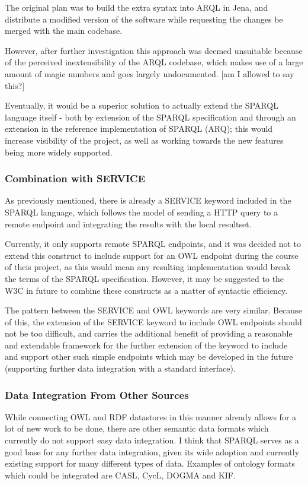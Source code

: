 \documentclass{article}
\begin{document}
The original plan was to build the extra syntax into ARQL in Jena, and
distribute a modified version of the software while requesting the changes be
merged with the main codebase.

However, after further investigation this approach was deemed unsuitable because
of the perceived inextensibility of the ARQL codebase, which makes use of a
large amount of magic numbers and goes largely undocumented. [am I allowed to
say this?]

Eventually, it would be a superior solution to actually extend the SPARQL
language itself - both by extension of the SPARQL
specification and through an extension in the reference implementation of SPARQL
(ARQ); this would increase visibility of the
project, as well as working towards the new features being more widely
supported.

\subsubsection{Combination with SERVICE}

As previously mentioned, there is already a SERVICE keyword included in the
SPARQL language, which follows the model of sending a HTTP query to a remote
endpoint and integrating the results with the local resultset.\cite{sservice}

Currently, it only supports remote SPARQL endpoints, and it was decided not to 
extend this construct to include support for an OWL endpoint during the course
of theis project, as this would mean any resulting implementation would break 
the terms of the SPARQL specification. However, it may be suggested to the W3C 
in future to combine these constructs as a matter of syntactic efficiency. 

The pattern between the SERVICE and OWL keywords are very
similar. Because of this, the extension of the SERVICE keyword to include OWL
endpoints should not be too difficult, and carries the additional benefit of
providing a reasonable and extendable framework for the further extension of the
keyword to include and support other such simple endpoints which may be
developed in the future (supporting further data integration with a standard
interface).

\subsubsection{Data Integration From Other Sources}

While connecting OWL and RDF datastores in this manner already allows for a lot
of new work to be done, there are other semantic data formats which currently do 
not support easy data integration. I think that SPARQL serves as a good base for 
any further data integration, given its wide adoption and currently existing 
support for many different types of data. Examples of ontology formats which
could be integrated are CASL, CycL, DOGMA and KIF.
\end{document}
